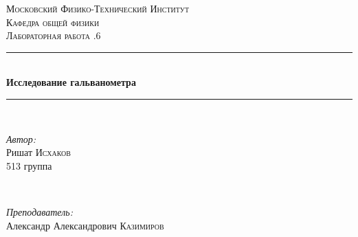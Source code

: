 \documentclass[a4paper, 12pt]{article}
\begin{document}
\begin{titlepage}

\newcommand{\HRule}{\rule{\linewidth}{0.5mm}} %

\center %
 

\textsc{\LARGE Московский Физико-Технический Институт}\\[1,5cm] %
\textsc{\Large Кафедра общей физики}\\[0.5cm] %
\textsc{\large Лабораторная работа .6}\\[0.5cm] %


\HRule
\\[0.4cm]
{ \huge \bfseries Исследование гальванометра}
\\[0.2cm] %
\HRule
\\[1.5cm]


 

\begin{minipage}{0.4\textwidth}
	\begin{flushleft} \large
		\emph{Автор:}\\
		Ришат \textsc{Исхаков} \\
		513 группа
	\end{flushleft}
\end{minipage}
~
\begin{minipage}{0.4\textwidth}
	\begin{flushright} \large
		\emph{Преподаватель:} \\
		Александр Александрович \textsc{Казимиров} %
	\end{flushright}
\end{minipage}


\end{titlepage}
\end{document}
